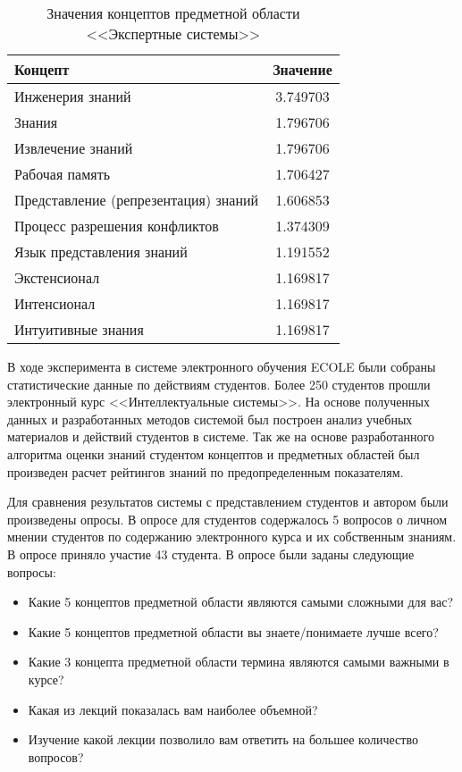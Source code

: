 \begin{table}
\centering
\caption{Значения концептов предметной области <<Экспертные системы>>}
\label{table:term_importance_result}
\begin{tabular}{|p{7cm}|c|}
\hline Концепт & Значение \\
\hline Инженерия знаний & 3.749703 \\
\hline Знания & 1.796706 \\
\hline Извлечение знаний & 1.796706 \\
\hline Рабочая память & 1.706427 \\
\hline Представление (репрезентация) знаний & 1.606853 \\
\hline Процесс разрешения конфликтов & 1.374309 \\
\hline Язык представления знаний & 1.191552 \\
\hline Экстенсионал & 1.169817 \\
\hline Интенсионал & 1.169817 \\
\hline Интуитивные знания & 1.169817 \\
\hline
\end{tabular}
\end{table}


В ходе эксперимента в системе электронного обучения ECOLE были собраны статистические данные по действиям студентов. Более 250 студентов прошли электронный курс <<Интеллектуальные системы>>. На основе полученных данных и разработанных методов системой был построен анализ учебных материалов и действий студентов в системе. Так же на основе разработанного алгоритма оценки знаний студентом концептов и предметных областей был произведен расчет рейтингов знаний по предопределенным показателям. 

Для сравнения результатов системы с представлением студентов и автором были произведены опросы. В опросе для студентов содержалось 5 вопросов о личном мнении студентов по содержанию электронного курса и их собственным знаниям. В опросе приняло участие 43 студента. В опросе были заданы следующие вопросы:

\begin{itemize}
\item Какие 5 концептов предметной области являются самыми сложными для вас?
\item Какие 5 концептов предметной области вы знаете/понимаете лучше всего?
\item Какие 3 концепта предметной области термина являются самыми важными в курсе?
\item Какая из лекций показалась вам наиболее объемной?
\item Изучение какой лекции позволило вам ответить на большее количество вопросов?
\end{itemize}

